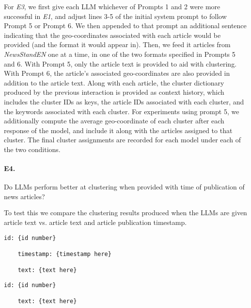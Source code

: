 For \emph{E3}, we first give each LLM whichever of Prompts 1 and 2 were more successful in \emph{E1}, and adjust lines 3-5 of the initial system prompt to follow Prompt 5 or Prompt 6.
We then appended to that prompt an additional sentence indicating that the geo-coordinates associated with each article would be provided (and the format it would appear in).
Then, we feed it articles from \emph{NewsStandEN} one at a time, in one of the two formats specified in Prompts 5 and 6. 
With Prompt 5, only the article text is provided to aid with clustering.
With Prompt 6, the article's associated geo-coordinates are also provided in addition to the article text.
Along with each article, the cluster dictionary produced by the previous interaction is provided as context history, which includes the cluster IDs as keys, the article IDs associated with each cluster, and the keywords associated with each cluster.
For experiments using prompt 5, we additionally compute the average geo-coordinate of each cluster after each response of the model, and include it along with the articles assigned to that cluster.
The final cluster assignments are recorded for each model under each of the two conditions.


\paragraph{\textbf{E4.}}
Do LLMs perform better at clustering when provided with time of publication of news articles? 

\noindent To test this we compare the clustering results produced when the LLMs are given article text vs. article text and article publication timestamp. 

\begin{lstlisting}[title=Prompt 7: Timestamp Prompt]
    id: {id number}
    
    timestamp: {timestamp here}

    text: {text here}
\end{lstlisting}
\begin{lstlisting}[title=Prompt 8: No Timestamp Prompt]
    id: {id number}

    text: {text here}
\end{lstlisting}

